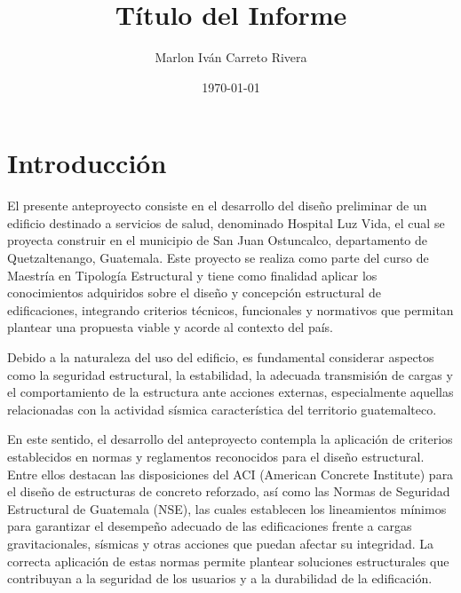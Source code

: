\documentclass[14pt,letterpaper]{extarticle}
\title{\textbf{Título del Informe}}
\author{Marlon Iván Carreto Rivera}
\date{\today}
\begin{document}
	
		
	\thispagestyle{empty}


	\newpage
	
	
	
	
	
	
	\renewcommand{\contentsname}{Contenido}
	\tableofcontents
	\newpage
	

	
	
	
	\section*{Introducción}
	
		
	El presente anteproyecto consiste en el desarrollo del diseño preliminar de un edificio destinado a servicios de salud, denominado Hospital Luz Vida, el cual se proyecta construir en el municipio de San Juan Ostuncalco, departamento de Quetzaltenango, Guatemala. Este proyecto se realiza como parte del curso de Maestría en Tipología Estructural y tiene como finalidad aplicar los conocimientos adquiridos sobre el diseño y concepción estructural de edificaciones, integrando criterios técnicos, funcionales y normativos que permitan plantear una propuesta viable y acorde al contexto del país.
	
	 Debido a la naturaleza del uso del edificio, es fundamental considerar aspectos como la seguridad estructural, la estabilidad, la adecuada transmisión de cargas y el comportamiento de la estructura ante acciones externas, especialmente aquellas relacionadas con la actividad sísmica característica del territorio guatemalteco.
	
	En este sentido, el desarrollo del anteproyecto contempla la aplicación de criterios establecidos en normas y reglamentos reconocidos para el diseño estructural. Entre ellos destacan las disposiciones del ACI (American Concrete Institute) para el diseño de estructuras de concreto reforzado, así como las Normas de Seguridad Estructural de Guatemala (NSE), las cuales establecen los lineamientos mínimos para garantizar el desempeño adecuado de las edificaciones frente a cargas gravitacionales, sísmicas y otras acciones que puedan afectar su integridad. La correcta aplicación de estas normas permite plantear soluciones estructurales que contribuyan a la seguridad de los usuarios y a la durabilidad de la edificación.
	
\end{document}
